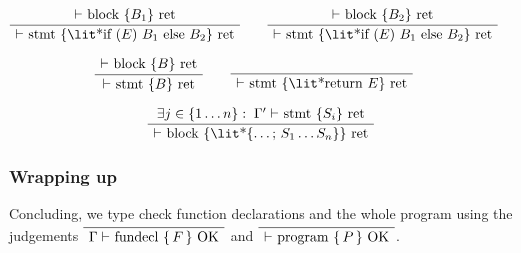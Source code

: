 \documentclass[10pt]{article} %
\theoremstyle{definitionstyle}
\theoremstyle{lemmastyle}
\newenvironment{Block}[1]{%
\begin{Warning}[singleextra={\path let \p1=(P), \p2=(O) in ($(\x2,0)+0.5*(0,\y1)$) node[mdframeleftlinetitle] {#1};}]%
}{%
\end{Warning}%
}
\begin{document}
\begin{Block}{Block/stmt returning}

\begin{align*}
\AxiomC{$\vdash $ block \{$B_1$\} ret}
\UnaryInfC{$\vdash $ stmt \{\lit*{if ($E$) $B_1$ else $B_2$}\} ret}
\DisplayProof
&\quad\quad
\AxiomC{$\vdash $ block \{$B_2$\} ret}
\UnaryInfC{$\vdash $ stmt \{\lit*{if ($E$) $B_1$ else $B_2$}\} ret}
\DisplayProof
\end{align*}

\begin{align*}
\AxiomC{$\vdash $ block \{$B$\} ret}
\UnaryInfC{$\vdash $ stmt \{$B$\} ret}
\DisplayProof
&\quad\quad
\AxiomC{\phantom{kelley}}
\UnaryInfC{$\vdash $ stmt \{\lit*{return $E$}\} ret}
\DisplayProof
\end{align*}

\begin{gather*}
\AxiomC{$\exists j \in \{1 \dots n\}:\;\Gamma' \vdash$ stmt \{$S_i$\} ret}
\UnaryInfC{$\vdash $ block \{\lit*{\{$\dots$; $S_1 \dots S_n$\}}\} ret}
\DisplayProof
\end{gather*}

\end{Block}

\subsubsection{Wrapping up}

Concluding, we type check function declarations and the whole program using the judgements $\bottomAlignProof\AxiomC{}\UnaryInfC{$\Gamma \vdash$ fundecl $\{\,F\,\}$ OK}\DisplayProof$ and $\bottomAlignProof\AxiomC{}\UnaryInfC{$\vdash$ program $\{\,P\,\}$ OK}\DisplayProof$.
\end{document}
